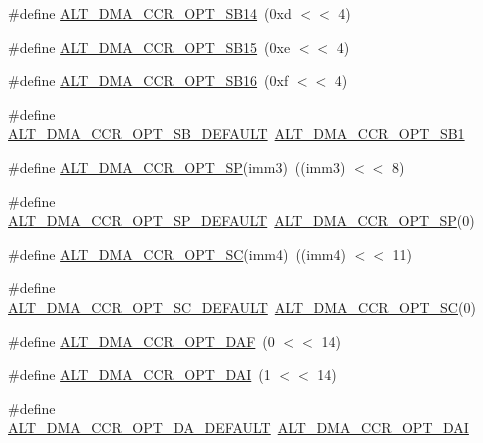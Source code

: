 \begin{DoxyCompactItemize}
\item 
\#define \mbox{\hyperlink{group__DMA__CCR_ga4442cc4d0b70756d007f05e614f1e805}{A\+L\+T\+\_\+\+D\+M\+A\+\_\+\+C\+C\+R\+\_\+\+O\+P\+T\+\_\+\+S\+B14}}~(0xd $<$$<$ 4)
\item 
\#define \mbox{\hyperlink{group__DMA__CCR_ga4f21482937d7dfd5aae4088761c952ba}{A\+L\+T\+\_\+\+D\+M\+A\+\_\+\+C\+C\+R\+\_\+\+O\+P\+T\+\_\+\+S\+B15}}~(0xe $<$$<$ 4)
\item 
\#define \mbox{\hyperlink{group__DMA__CCR_ga4ad8211b4dc2afdb43b24b0af349b57b}{A\+L\+T\+\_\+\+D\+M\+A\+\_\+\+C\+C\+R\+\_\+\+O\+P\+T\+\_\+\+S\+B16}}~(0xf $<$$<$ 4)
\item 
\#define \mbox{\hyperlink{group__DMA__CCR_ga702fc6c5003d1cd75f3a3f5cce02997b}{A\+L\+T\+\_\+\+D\+M\+A\+\_\+\+C\+C\+R\+\_\+\+O\+P\+T\+\_\+\+S\+B\+\_\+\+D\+E\+F\+A\+U\+LT}}~\mbox{\hyperlink{group__DMA__CCR_gadac10e70bd98b243bab29b4bc231afcb}{A\+L\+T\+\_\+\+D\+M\+A\+\_\+\+C\+C\+R\+\_\+\+O\+P\+T\+\_\+\+S\+B1}}
\item 
\#define \mbox{\hyperlink{group__DMA__CCR_gaa502c9abaf4b96aeecb4214a73070c97}{A\+L\+T\+\_\+\+D\+M\+A\+\_\+\+C\+C\+R\+\_\+\+O\+P\+T\+\_\+\+SP}}(imm3)~((imm3) $<$$<$ 8)
\item 
\#define \mbox{\hyperlink{group__DMA__CCR_gaf47f0ba30e3f05d78a3b51a40b3478e6}{A\+L\+T\+\_\+\+D\+M\+A\+\_\+\+C\+C\+R\+\_\+\+O\+P\+T\+\_\+\+S\+P\+\_\+\+D\+E\+F\+A\+U\+LT}}~\mbox{\hyperlink{group__DMA__CCR_gaa502c9abaf4b96aeecb4214a73070c97}{A\+L\+T\+\_\+\+D\+M\+A\+\_\+\+C\+C\+R\+\_\+\+O\+P\+T\+\_\+\+SP}}(0)
\item 
\#define \mbox{\hyperlink{group__DMA__CCR_ga6e07d155bc846403e2e0c6c2057f6a51}{A\+L\+T\+\_\+\+D\+M\+A\+\_\+\+C\+C\+R\+\_\+\+O\+P\+T\+\_\+\+SC}}(imm4)~((imm4) $<$$<$ 11)
\item 
\#define \mbox{\hyperlink{group__DMA__CCR_ga72d048ac840d4dce5baa4789fde9004b}{A\+L\+T\+\_\+\+D\+M\+A\+\_\+\+C\+C\+R\+\_\+\+O\+P\+T\+\_\+\+S\+C\+\_\+\+D\+E\+F\+A\+U\+LT}}~\mbox{\hyperlink{group__DMA__CCR_ga6e07d155bc846403e2e0c6c2057f6a51}{A\+L\+T\+\_\+\+D\+M\+A\+\_\+\+C\+C\+R\+\_\+\+O\+P\+T\+\_\+\+SC}}(0)
\item 
\#define \mbox{\hyperlink{group__DMA__CCR_gaffda936c5572db57ce9563c27a317abd}{A\+L\+T\+\_\+\+D\+M\+A\+\_\+\+C\+C\+R\+\_\+\+O\+P\+T\+\_\+\+D\+AF}}~(0 $<$$<$ 14)
\item 
\#define \mbox{\hyperlink{group__DMA__CCR_ga9290a222b62be4c5fdffbe80a988650b}{A\+L\+T\+\_\+\+D\+M\+A\+\_\+\+C\+C\+R\+\_\+\+O\+P\+T\+\_\+\+D\+AI}}~(1 $<$$<$ 14)
\item 
\#define \mbox{\hyperlink{group__DMA__CCR_ga428b18ad056257c6dd89f3f931c15df2}{A\+L\+T\+\_\+\+D\+M\+A\+\_\+\+C\+C\+R\+\_\+\+O\+P\+T\+\_\+\+D\+A\+\_\+\+D\+E\+F\+A\+U\+LT}}~\mbox{\hyperlink{group__DMA__CCR_ga9290a222b62be4c5fdffbe80a988650b}{A\+L\+T\+\_\+\+D\+M\+A\+\_\+\+C\+C\+R\+\_\+\+O\+P\+T\+\_\+\+D\+AI}}
$$
\end{DoxyCompactItemize}
